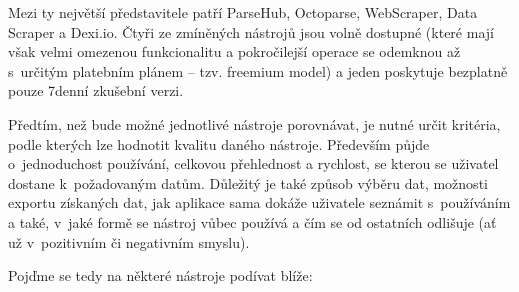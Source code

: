 \documentclass[thesis=B,czech]{FITthesis2}[2012/06/26]
\begin{document}
	Mezi ty největší představitele patří ParseHub, Octoparse, WebScraper, Data Scraper a Dexi.io. Čtyři ze zmíněných nástrojů jsou volně dostupné (které mají však velmi omezenou funkcionalitu a pokročilejší operace se odemknou až s~určitým platebním plánem -- tzv. freemium model) a jeden poskytuje bezplatně pouze 7denní zkušební verzi.
	
	Předtím, než bude možné jednotlivé nástroje porovnávat, je nutné určit kritéria, podle kterých lze hodnotit kvalitu daného nástroje. Především půjde o~jednoduchost používání, celkovou přehlednost a rychlost, se kterou se uživatel dostane k~požadovaným datům. Důležitý je také způsob výběru dat, možnosti exportu získaných dat, jak aplikace sama dokáže uživatele seznámit s~používáním a také, v~jaké formě se nástroj vůbec používá a čím se od ostatních odlišuje (ať už v~pozitivním či negativním smyslu). 
	
	Poj\v{d}me se tedy na některé nástroje podívat blíže:
	
\end{document}
